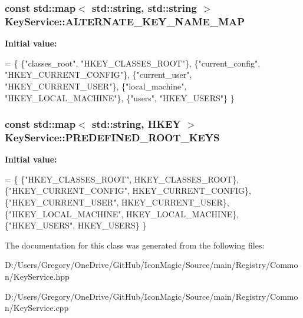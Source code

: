 \subsubsection[{A\+L\+T\+E\+R\+N\+A\+T\+E\+\_\+\+K\+E\+Y\+\_\+\+N\+A\+M\+E\+\_\+\+M\+A\+P}]{\setlength{\rightskip}{0pt plus 5cm}const std\+::map$<$ std\+::string, std\+::string $>$ Key\+Service\+::\+A\+L\+T\+E\+R\+N\+A\+T\+E\+\_\+\+K\+E\+Y\+\_\+\+N\+A\+M\+E\+\_\+\+M\+A\+P\hspace{0.3cm}{\ttfamily [static]}}\label{class_key_service_a142ce8aec67304045a1151e6ac8429a1}
{\bfseries Initial value\+:}
\begin{DoxyCode}
= \{
  \{\textcolor{stringliteral}{"classes\_root"}, \textcolor{stringliteral}{"HKEY\_CLASSES\_ROOT"}\},
  \{\textcolor{stringliteral}{"current\_config"}, \textcolor{stringliteral}{"HKEY\_CURRENT\_CONFIG"}\},
  \{\textcolor{stringliteral}{"current\_user"}, \textcolor{stringliteral}{"HKEY\_CURRENT\_USER"}\},
  \{\textcolor{stringliteral}{"local\_machine"}, \textcolor{stringliteral}{"HKEY\_LOCAL\_MACHINE"}\},
  \{\textcolor{stringliteral}{"users"}, \textcolor{stringliteral}{"HKEY\_USERS"}\}
\}
\end{DoxyCode}
\hypertarget{class_key_service_a105020a568634a91740816aff99ad318}{}
\subsubsection[{P\+R\+E\+D\+E\+F\+I\+N\+E\+D\+\_\+\+R\+O\+O\+T\+\_\+\+K\+E\+Y\+S}]{\setlength{\rightskip}{0pt plus 5cm}const std\+::map$<$ std\+::string, H\+K\+E\+Y $>$ Key\+Service\+::\+P\+R\+E\+D\+E\+F\+I\+N\+E\+D\+\_\+\+R\+O\+O\+T\+\_\+\+K\+E\+Y\+S\hspace{0.3cm}{\ttfamily [static]}}\label{class_key_service_a105020a568634a91740816aff99ad318}
{\bfseries Initial value\+:}
\begin{DoxyCode}
= \{
  \{\textcolor{stringliteral}{"HKEY\_CLASSES\_ROOT"}, HKEY\_CLASSES\_ROOT\},
  \{\textcolor{stringliteral}{"HKEY\_CURRENT\_CONFIG"}, HKEY\_CURRENT\_CONFIG\},
  \{\textcolor{stringliteral}{"HKEY\_CURRENT\_USER"}, HKEY\_CURRENT\_USER\},
  \{\textcolor{stringliteral}{"HKEY\_LOCAL\_MACHINE"}, HKEY\_LOCAL\_MACHINE\},
  \{\textcolor{stringliteral}{"HKEY\_USERS"}, HKEY\_USERS\}
\}
\end{DoxyCode}


The documentation for this class was generated from the following files\+:\begin{DoxyCompactItemize}
\item 
D\+:/\+Users/\+Gregory/\+One\+Drive/\+Git\+Hub/\+Icon\+Magic/\+Source/main/\+Registry/\+Common/Key\+Service.\+hpp\item 
D\+:/\+Users/\+Gregory/\+One\+Drive/\+Git\+Hub/\+Icon\+Magic/\+Source/main/\+Registry/\+Common/Key\+Service.\+cpp\end{DoxyCompactItemize}
